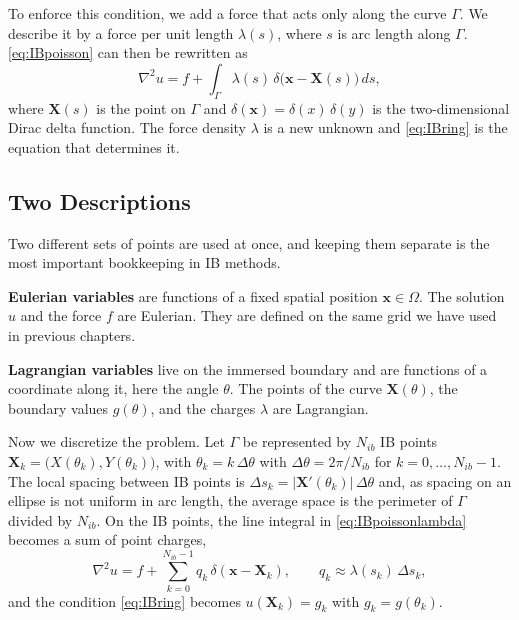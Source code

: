 To enforce this condition, we add a force that acts only along the curve
$\Gamma$. We describe it by a force per unit length $\lambda(s)$, where $s$
is arc length along $\Gamma$. \eqref{eq:IBpoisson} can then be rewritten as
\begin{equation}
  \nabla^2 u = f + \int_{\Gamma} \lambda(s)\,
  \delta\big(\mathbf{x} - \mathbf{X}(s)\big)\,ds,
  \label{eq:IBpoissonlambda}
\end{equation}
where $\mathbf{X}(s)$ is the point on $\Gamma$ and
$\delta(\mathbf{x}) = \delta(x)\,\delta(y)$ is the two-dimensional Dirac
delta function. The force density $\lambda$ is a new unknown and
\eqref{eq:IBring} is the equation that determines it.


\subsection{Two Descriptions}
\label{sec:IBdescriptions}

Two different sets of points are used at once, and keeping them separate
is the most important bookkeeping in IB methods.

\begin{definition}
\textbf{Eulerian variables} are functions of a fixed spatial position
$\mathbf{x} \in \Omega$. The solution $u$ and the force $f$ are Eulerian.
They are defined on the same grid we have used in previous chapters.
\end{definition}

\begin{definition}
\textbf{Lagrangian variables} live on the immersed boundary and are
functions of a coordinate along it, here the angle $\theta$. The points of
the curve $\mathbf{X}(\theta)$, the boundary values $g(\theta)$, and the
charges $\lambda$ are Lagrangian.
\end{definition}

Now we discretize the problem. Let $\Gamma$ be represented by $N_{ib}$ IB points
$\mathbf{X}_k = \big(X(\theta_k), Y(\theta_k)\big)$, with
$\theta_k = k\,\Delta\theta$ with $\Delta\theta = 2\pi/N_{ib}$ for
$k = 0,\dots,N_{ib}-1$. The local spacing between IB points is
$\Delta s_k = |\mathbf{X}'(\theta_k)|\,\Delta\theta$ and, as spacing on an ellipse is not uniform in arc length, the average space is the
perimeter of $\Gamma$ divided by $N_{ib}$. On the IB points, the line
integral in \eqref{eq:IBpoissonlambda} becomes a sum of point charges,
\begin{equation}
  \nabla^2 u = f + \sum_{k=0}^{N_{ib}-1} q_k\,
  \delta(\mathbf{x} - \mathbf{X}_k),
  \qquad q_k \approx \lambda(s_k)\,\Delta s_k,
  \label{eq:IBpoissonq}
\end{equation}
and the condition \eqref{eq:IBring} becomes $u(\mathbf{X}_k) = g_k$ with
$g_k = g(\theta_k)$.
